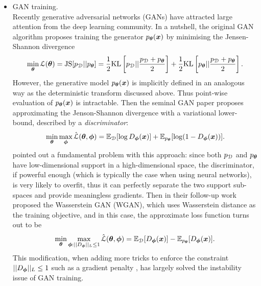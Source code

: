 \begin{itemize}
\item GAN training. \\
Recently generative adversarial networks (GANs) \citep{goodfellow:gan2014} have attracted large attention from the deep learning community. In a nutshell, the original GAN algorithm proposes training the generator $p_{\bm{\theta}}(\bm{x})$ by minimising the Jensen-Shannon divergence
\begin{equation}
\min_{\bm{\theta}} \mathcal{L}(\bm{\theta}) = \mathrm{JS}[p_{\mathcal{D}} || p_{\bm{\theta}}] = \frac{1}{2} \mathrm{KL}\left[ p_{\mathcal{D}} || \frac{p_{\mathcal{D}} + p_{\bm{\theta}}}{2} \right] + \frac{1}{2} \mathrm{KL}\left[ p_{\bm{\theta}} || \frac{p_{\mathcal{D}} + p_{\bm{\theta}}}{2} \right].
\end{equation}
However, the generative model $p_{\bm{\theta}}(\bm{x})$ is implicitly defined in an analogous way as the deterministic transform discussed above. Thus point-wise evaluation of $p_{\bm{\theta}}(\bm{x})$ is intractable. Then the seminal GAN paper proposes approximating the Jenson-Shannon divergence \citep{lin:jensen_shannon1991} with a variational lower-bound, described by a \emph{discriminator}:
\begin{equation}
\min_{\bm{\theta}} \max_{\bm{\phi}} \hat{\mathcal{L}}(\bm{\theta}, \bm{\phi}) = \mathbb{E}_{\mathcal{D}} [\log D_{\bm{\phi}}(\bm{x})] + \mathbb{E}_{p_{\bm{\theta}}} [\log (1 - D_{\bm{\phi}}(\bm{x}))].
\label{eq:chap5_original_gan}
\end{equation}
\cite{arjovsky:gan_problems2017} pointed out a fundamental problem with this approach: since both $p_{\mathcal{D}}$ and $p_{\bm{\theta}}$ have low-dimensional support in a high-dimensional space, the discriminator, if powerful enough (which is typically the case when using neural networks), is very likely to overfit, thus it can perfectly separate the two support sub-spaces and provide meaningless gradients. Then in their follow-up work \cite{arjovsky:wgan2017} proposed the Wasserstein GAN (WGAN), which uses Wasserstein distance \citep{villani:optimal_transport2008} as the training objective, and in this case, the approximate loss function turns out to be
\begin{equation}
\min_{\bm{\theta}} \max_{\bm{\phi}: || D_{\bm{\phi}}||_L \leq 1} \hat{\mathcal{L}}(\bm{\theta}, \bm{\phi}) = \mathbb{E}_{\mathcal{D}} [D_{\bm{\phi}}(\bm{x})] - \mathbb{E}_{p_{\bm{\theta}}} [D_{\bm{\phi}}(\bm{x})].
\label{eq:chap5_wgan}
\end{equation}
This modification, when adding more tricks to enforce the constraint $|| D_{\bm{\phi}}||_L \leq 1$ such as a gradient penalty \citep{gulrajani:wgan_gp2017}, has largely solved the instability issue of GAN training.


\end{itemize}
